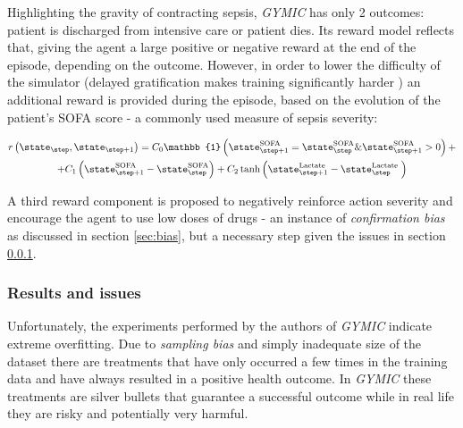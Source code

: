 Highlighting the gravity of contracting sepsis, \emph{GYMIC} has only 2 outcomes: patient is discharged from intensive care or patient dies.
Its reward model reflects that, giving the agent a large positive or negative reward at the end of the episode, depending on the outcome.
However, in order to lower the difficulty of the simulator (delayed gratification makes training significantly harder \cite{delayedgrat-humans, delayedgrat-ai}) an additional reward is provided during the episode, based on the evolution of the patient's SOFA score \cite{sofa} - a commonly used measure of sepsis severity:

\begin{multline}
r\left(\state_{\step}, \state_{\step+1}\right)=C_{0} \mathbb{1}\left(\state_{\step+1}^{\mathrm{SOFA}}=\state_{\step}^{\mathrm{SOFA}} \& \state_{\step+1}^{\text {SOFA }}>0\right) + \\ +
C_{1}\left(\state_{\step+1}^{\mathrm{SOFA}}-\state_{\step}^{\mathrm{SOFA}}\right) + 
C_{2} \tanh \left(\state_{\step+1}^{\text {Lactate }}-\state_{\step}^{\text {Lactate }}\right)
\end{multline}

A third reward component is proposed to negatively reinforce action severity and encourage the agent to use low doses of drugs - an instance of \emph{confirmation bias} as discussed in section \ref{sec:bias}, but a necessary step given the issues in section \ref{sec:gymic-results}.

\subsubsection{Results and issues}
\label{sec:gymic-results}

Unfortunately, the experiments performed by the authors of \emph{GYMIC} indicate extreme overfitting.
Due to \emph{sampling bias} and simply inadequate size of the dataset there are treatments that have only occurred a few times in the training data and have always resulted in a positive health outcome.
In \emph{GYMIC} these treatments are silver bullets that guarantee a successful outcome while in real life they are risky and potentially very harmful.
